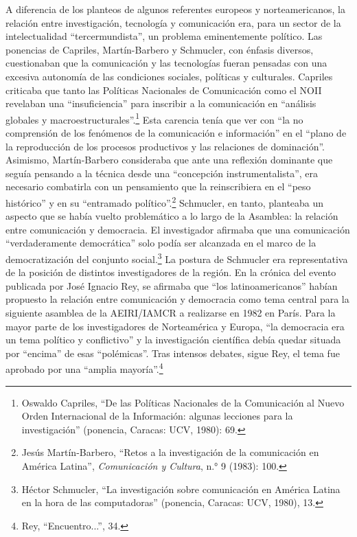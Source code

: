 \documentclass{tufte-handout}
\begin{document}
A diferencia de los planteos de algunos referentes europeos y
norteamericanos, la relación entre investigación, tecnología y
comunicación era, para un sector de la intelectualidad
``tercermundista'', un problema eminentemente político. Las ponencias de
Capriles, Martín-Barbero y Schmucler, con énfasis diversos, cuestionaban
que la comunicación y las tecnologías fueran pensadas con una excesiva
autonomía de las condiciones sociales, políticas y culturales. Capriles
criticaba que tanto las Políticas Nacionales de Comunicación como el
NOII revelaban una ``insuficiencia'' para inscribir a la comunicación en
``análisis globales y macroestructurales''.\footnote{Oswaldo Capriles,
  ``De las Políticas Nacionales de la Comunicación al Nuevo Orden
  Internacional de la Información: algunas lecciones para la
  investigación'' (ponencia, Caracas: UCV, 1980): 69.} Esta carencia
tenía que ver con ``la no comprensión de los fenómenos de la
comunicación e información'' en el ``plano de la reproducción de los
procesos productivos y las relaciones de dominación''. Asimismo,
Martín-Barbero consideraba que ante una reflexión dominante que seguía
pensando a la técnica desde una ``concepción instrumentalista'', era
necesario combatirla con un pensamiento que la reinscribiera en el
``peso histórico'' y en su ``entramado político''.\footnote{Jesús
  Martín-Barbero, ``Retos a la investigación de la comunicación en
  América Latina'', \emph{Comunicación y Cultura}, n.° 9 (1983): 100.}
Schmucler, en tanto, planteaba un aspecto que se había vuelto
problemático a lo largo de la Asamblea: la relación entre comunicación y
democracia. El investigador afirmaba que una comunicación
``verdaderamente democrática'' solo podía ser alcanzada en el marco de
la democratización del conjunto social.\footnote{Héctor Schmucler, ``La
  investigación sobre comunicación en América Latina en la hora de las
  computadoras'' (ponencia, Caracas: UCV, 1980), 13.} La postura de
Schmucler era representativa de la posición de distintos investigadores
de la región. En la crónica del evento publicada por José Ignacio Rey,
se afirmaba que ``los latinoamericanos'' habían propuesto la relación
entre comunicación y democracia como tema central para la siguiente
asamblea de la AEIRI/IAMCR a realizarse en 1982 en París. Para la mayor
parte de los investigadores de Norteamérica y Europa, ``la democracia
era un tema político y conflictivo'' y la investigación científica debía
quedar situada por ``encima'' de esas ``polémicas''. Tras intensos
debates, sigue Rey, el tema fue aprobado por una ``amplia
mayoría''.\footnote{Rey, ``Encuentro...'', 34.}
\end{document}
